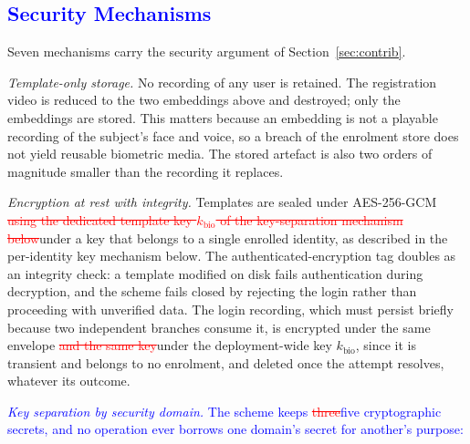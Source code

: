 \documentclass[10pt,journal,compsoc]{IEEEtran}
\begin{document}
{\subsection{\textcolor{blue}{Security Mechanisms}}\label{sec:security}
Seven mechanisms carry the security argument of Section~\ref{sec:contrib}.

\emph{Template-only storage.} No recording of any user is retained. The registration video is reduced to the two embeddings above and destroyed; only the embeddings are stored. This matters because an embedding is not a playable recording of the subject's face and voice, so a breach of the enrolment store does not yield reusable biometric media. The stored artefact is also two orders of magnitude smaller than the recording it replaces.

\emph{Encryption at rest with integrity.} Templates are sealed under AES-256-GCM \textcolor{red}{\sout{using the dedicated template key $k_{\text{bio}}$ of the key-separation mechanism below}}\textcolor{revpink}{under a key that belongs to a single enrolled identity, as described in the per-identity key mechanism below}. The authenticated-encryption tag doubles as an integrity check: a template modified on disk fails authentication during decryption, and the scheme fails closed by rejecting the login rather than proceeding with unverified data. The login recording, which must persist briefly because two independent branches consume it, is encrypted under the same envelope \textcolor{red}{\sout{and the same key}}\textcolor{revpink}{under the deployment-wide key $k_{\text{bio}}$, since it is transient and belongs to no enrolment,} and deleted once the attempt resolves, whatever its outcome.

\textcolor{blue}{\emph{Key separation by security domain.} The scheme keeps \textcolor{red}{\sout{three}}\textcolor{revpink}{five} cryptographic secrets, and no operation ever borrows one domain's secret for another's purpose:}

}
\end{document}
